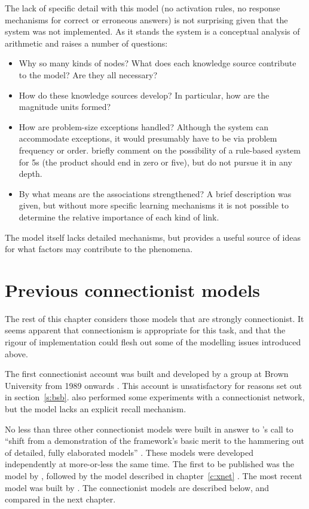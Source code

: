 The lack of specific detail with this model (no activation rules, no
response mechanisms for correct or erroneous answers) is
not surprising given
that the system was not implemented.  As it stands the system is a
conceptual analysis of arithmetic and raises a number of questions:
\begin{itemize}
\item Why so many kinds of nodes?  What does each knowledge source
contribute to the model?  Are they all necessary?
\item How do these knowledge sources develop?   In particular, how are
the magnitude units formed?
\item How are problem-size exceptions handled?  Although
the system can accommodate exceptions, it would presumably have to be via
problem frequency or order.
 briefly comment on the
possibility of a rule-based system for 5s (the product should end in
zero or five), but do not pursue it in any depth.
\item By what means are the associations strengthened?  A brief
description was given, but without more specific learning mechanisms it
is not possible to determine the relative importance of each kind of
link.
\end{itemize}
The model itself lacks detailed mechanisms, but provides a useful source
of ideas for what factors may contribute to the phenomena.


\section{Previous connectionist models}

The rest of this chapter considers those models that are strongly
connectionist.  It seems apparent that connectionism is
appropriate for this task, and that the rigour of implementation could
flesh out some of the modelling issues introduced above.

The first connectionist account was built and developed by a group at Brown
University from 1989 onwards \cite{andestud,viscrepr,viscmemo,andeexpe}.
This account is unsatisfactory for reasons set out in
section~\ref{s:bsb}.  also performed some experiments with
a connectionist network, but the model lacks an explicit recall mechanism.

No less than three other connectionist models were built in
answer to \citeauthor{mcclmode}'s call to ``shift from a demonstration of
the framework's basic merit to the hammering out of detailed, fully
elaborated models'' \citeyear[p.~394]{mcclmode}.  These models were
developed independently at more-or-less the same time. The first to be
published was the model by , followed by the model
described in chapter~\ref{c:xnet} \cite{dallmemo,dallspee}. The most recent
model was built by .
The connectionist models are described below, and compared in the next
chapter.

